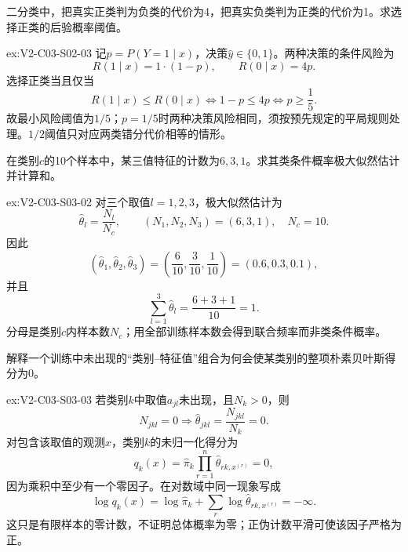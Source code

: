 \begin{SLChapterExercisePairSection}
\begin{exercise}\label{ex:V2-C03-S02-03}
二分类中，把真实正类判为负类的代价为4，把真实负类判为正类的代价为1。求选择正类的后验概率阈值。
\end{exercise}
\ifSLFullEdition
{}\label{sol:V2-C03-S02-03}
\begin{chapterexercisesolution}{ex:V2-C03-S02-03}
记$p=P(Y=1\mid x)$，决策$\widehat y\in\{0,1\}$。两种决策的条件风险为
\[
R(1\mid x)=1\cdot(1-p),
\qquad
R(0\mid x)=4p.
\]
选择正类当且仅当
\[
R(1\mid x)\leq R(0\mid x)
\Longleftrightarrow
1-p\leq4p
\Longleftrightarrow
p\geq\frac15.
\]
故最小风险阈值为$1/5$；$p=1/5$时两种决策风险相同，须按预先规定的平局规则处理。$1/2$阈值只对应两类错分代价相等的情形。
\end{chapterexercisesolution}
\fi

\begin{exercise}\label{ex:V2-C03-S03-02}
在类别$c$的10个样本中，某三值特征的计数为$6,3,1$。求其类条件概率极大似然估计并计算和。
\end{exercise}
\ifSLFullEdition
{}\label{sol:V2-C03-S03-02}
\begin{chapterexercisesolution}{ex:V2-C03-S03-02}
对三个取值$l=1,2,3$，极大似然估计为
\[
\widehat\theta_l
=\frac{N_l}{N_c},
\qquad
(N_1,N_2,N_3)=(6,3,1),\quad N_c=10.
\]
因此
\[
(\widehat\theta_1,\widehat\theta_2,\widehat\theta_3)
=\left(\frac6{10},\frac3{10},\frac1{10}\right)
=(0.6,0.3,0.1),
\]
并且
\[
\sum_{l=1}^{3}\widehat\theta_l
=\frac{6+3+1}{10}=1.
\]
分母是类别$c$内样本数$N_c$；用全部训练样本数会得到联合频率而非类条件概率。
\end{chapterexercisesolution}
\fi

\begin{exercise}\label{ex:V2-C03-S03-03}
解释一个训练中未出现的“类别--特征值”组合为何会使某类别的整项朴素贝叶斯得分为0。
\end{exercise}
\ifSLFullEdition
{}\label{sol:V2-C03-S03-03}
\begin{chapterexercisesolution}{ex:V2-C03-S03-03}
若类别$k$中取值$a_{jl}$未出现，且$N_k>0$，则
\[
N_{jkl}=0
\Longrightarrow
\widehat\theta_{jkl}=\frac{N_{jkl}}{N_k}=0.
\]
对包含该取值的观测$x$，类别$k$的未归一化得分为
\[
q_k(x)
=\widehat\pi_k\prod_{r=1}^{n}\widehat\theta_{rk,x^{(r)}}
=0,
\]
因为乘积中至少有一个零因子。在对数域中同一现象写成
\[
\log q_k(x)
=\log\widehat\pi_k+\sum_r\log\widehat\theta_{rk,x^{(r)}}
=-\infty.
\]
这只是有限样本的零计数，不证明总体概率为零；正伪计数平滑可使该因子严格为正。
\end{chapterexercisesolution}
\fi


\end{SLChapterExercisePairSection}
